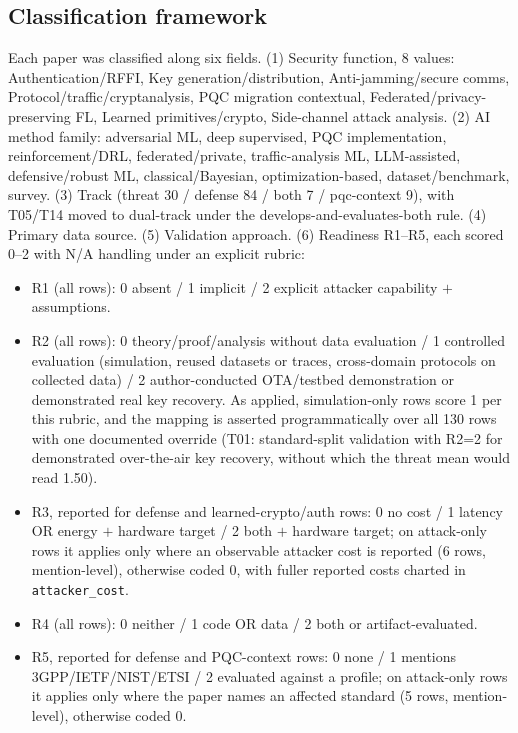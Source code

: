 \documentclass[11pt,a4paper]{article}
\begin{document}
\subsection{Classification framework}
Each paper was classified along six fields. (1) Security function, 8 values: Authentication/RFFI, Key generation/distribution, Anti-jamming/secure comms, Protocol/traffic/cryptanalysis, PQC migration contextual, Federated/privacy-preserving FL, Learned primitives/crypto, Side-channel attack analysis. (2) AI method family: adversarial ML, deep supervised, PQC implementation, reinforcement/DRL, federated/private, traffic-analysis ML, LLM-assisted, defensive/robust ML, classical/Bayesian, optimization-based, dataset/benchmark, survey. (3) Track (threat 30 / defense 84 / both 7 / pqc-context 9), with T05/T14 moved to dual-track under the develops-and-evaluates-both rule. (4) Primary data source. (5) Validation approach. (6) Readiness R1--R5, each scored 0--2 with N/A handling under an explicit rubric:
\begin{itemize}\setlength\itemsep{1pt}
\item R1 (all rows): 0 absent / 1 implicit / 2 explicit attacker capability $+$ assumptions.
\item R2 (all rows): 0 theory/proof/analysis without data evaluation / 1 controlled evaluation (simulation, reused datasets or traces, cross-domain protocols on collected data) / 2 author-conducted OTA/testbed demonstration or demonstrated real key recovery. As applied, simulation-only rows score 1 per this rubric, and the mapping is asserted programmatically over all 130 rows with one documented override (T01: standard-split validation with R2=2 for demonstrated over-the-air key recovery, without which the threat mean would read 1.50).
\item R3, reported for defense and learned-crypto/auth rows: 0 no cost / 1 latency OR energy $+$ hardware target / 2 both $+$ hardware target; on attack-only rows it applies only where an observable attacker cost is reported (6 rows, mention-level), otherwise coded 0, with fuller reported costs charted in \texttt{attacker\_cost}.
\item R4 (all rows): 0 neither / 1 code OR data / 2 both or artifact-evaluated.
\item R5, reported for defense and PQC-context rows: 0 none / 1 mentions 3GPP/IETF/NIST/ETSI / 2 evaluated against a profile; on attack-only rows it applies only where the paper names an affected standard (5 rows, mention-level), otherwise coded 0.
\end{itemize}
\end{document}

